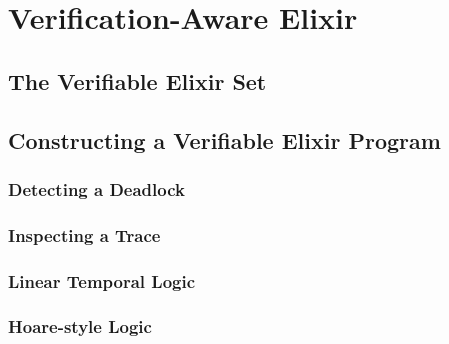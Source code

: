 \chapter{Verification-Aware Elixir}
\section{The Verifiable Elixir Set}
\section{Constructing a Verifiable Elixir Program}
\subsection{Detecting a Deadlock}
\subsection{Inspecting a Trace}
\subsection{Linear Temporal Logic}
\subsection{Hoare-style Logic}